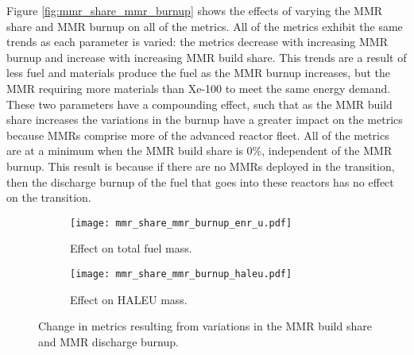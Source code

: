 Figure \ref{fig:mmr_share_mmr_burnup} shows the effects of varying 
the \gls{MMR} share and \gls{MMR} burnup on all of the metrics. All of 
the metrics exhibit the same trends as each parameter is varied: the 
metrics decrease with increasing \gls{MMR} burnup and increase 
with increasing \gls{MMR} build share. This trends are a result of 
less fuel and materials produce the fuel as the \gls{MMR} burnup increases, 
but the \gls{MMR} requiring more materials than Xe-100 to meet the same 
energy demand. These two parameters have a 
compounding effect, such that as the \gls{MMR} build share increases 
the variations in the burnup have a greater impact on the metrics because 
\glspl{MMR} comprise more of the advanced reactor fleet. All of the metrics 
are at a minimum when the \gls{MMR} build share is 0\%, independent of 
the \gls{MMR} burnup. This result is because if there are no \glspl{MMR} 
deployed in the transition, then the discharge burnup of the fuel that 
goes into these reactors has no effect on the transition. 


\begin{figure}
    \begin{subfigure}[h!]{0.48\textwidth}
        \centering
        \texttt{[image: mmr\_share\_mmr\_burnup\_enr\_u.pdf]}
        \caption{Effect on total fuel mass.}
        \label{fig:mmr_share_mmr_burnup_enr_u}
    \end{subfigure}
    \hfill
    \begin{subfigure}[h!]{0.48\textwidth}
        \centering
        \texttt{[image: mmr\_share\_mmr\_burnup\_haleu.pdf]}
        \caption{Effect on HALEU mass.}
        \label{fig:mmr_share_mmr_burnup_haleu}
    \end{subfigure}
    \caption{Change in metrics resulting from variations in the 
    MMR build share and MMR discharge burnup.}
\end{figure}

